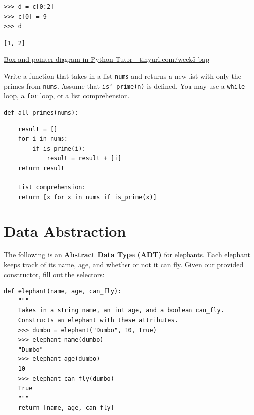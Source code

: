 \documentclass{exam}
\begin{document}
\begin{questions}
\begin{blocksection}
\begin{lstlisting}
>>> d = c[0:2]
>>> c[0] = 9
>>> d
\end{lstlisting}
\begin{solution}
\begin{lstlisting}
[1, 2]
\end{lstlisting}
\end{solution}

\begin{solution}
\href{http://goo.gl/Gxe0qv}{Box and pointer diagram in Python Tutor -  tinyurl.com/week5-bap}
\end{solution}
\end{blocksection}


\begin{blocksection}
\question Write a function that takes in a list \texttt{nums} and returns a
new list with only the primes from \texttt{nums}. Assume that
\texttt{is\char`_prime(n)} is defined. You may use a \texttt{while} loop, a
\texttt{for} loop, or a list comprehension.

\begin{lstlisting}
def all_primes(nums):
\end{lstlisting}
\begin{solution}[2in]
\begin{lstlisting}
    result = []
    for i in nums:
        if is_prime(i):
            result = result + [i]
    return result

    List comprehension:
    return [x for x in nums if is_prime(x)]
\end{lstlisting}
\end{solution}
\end{blocksection}

\section{Data Abstraction}

\begin{blocksection}
\question The following is an \textbf{Abstract Data Type (ADT)} for elephants.
Each elephant keeps track of its name, age, and whether or not it can fly. Given
our provided constructor, fill out the selectors:

\begin{lstlisting}
def elephant(name, age, can_fly):
    """
    Takes in a string name, an int age, and a boolean can_fly.
    Constructs an elephant with these attributes.
    >>> dumbo = elephant("Dumbo", 10, True)
    >>> elephant_name(dumbo)
    "Dumbo"
    >>> elephant_age(dumbo)
    10
    >>> elephant_can_fly(dumbo)
    True
    """
    return [name, age, can_fly]
\end{lstlisting}


\end{blocksection}
\end{questions}
\end{document}
